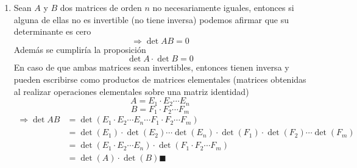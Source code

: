 \documentclass[12pt, letterpaper]{article}
\begin{document}
\begin{enumerate}
    \item Sean $A$ y $B$ dos matrices de orden $n$ no necesariamente iguales, entonces si alguna de ellas no es invertible (no tiene inversa) podemos afirmar que su determinante es cero
    \begin{equation*}
        \Rightarrow \det AB = 0
    \end{equation*}
    Además se cumpliría la proposición
    \begin{equation*}
        \det A \cdot \det B = 0
    \end{equation*}
    En caso de que ambas matrices sean invertibles, entonces tienen inversa y pueden escribirse como productos de matrices elementales (matrices obtenidas al realizar operaciones elementales sobre una matriz identidad)
    \begin{equation*}
        A = E_{1} \cdot E_{2} \cdots E_{n}
    \end{equation*}
    \begin{equation*}
        B = F_{1} \cdot F_{2} \cdots F_{m}
    \end{equation*}
    \begin{equation*}
        \begin{aligned}
            \Rightarrow \det AB
            & = \det (E_{1} \cdot E_{2} \cdots E_{n} \cdots F_{1} \cdot F_{2} \cdots F_{m}) \\
            & = \det(E_{1}) \cdot \det(E_{2}) \cdots \det(E_{n}) \cdot \det(F_{1}) \cdot \det(F_{2}) \cdots \det(F_{m}) \\
            & = \det(E_{1} \cdot E_{2} \cdots E_{n}) \cdot \det(F_{1} \cdot F_{2} \cdots F_{m}) \\
            & = \det(A) \cdot \det(B) \blacksquare 
        \end{aligned}
    \end{equation*}

\end{enumerate}

\newpage
\end{document}
